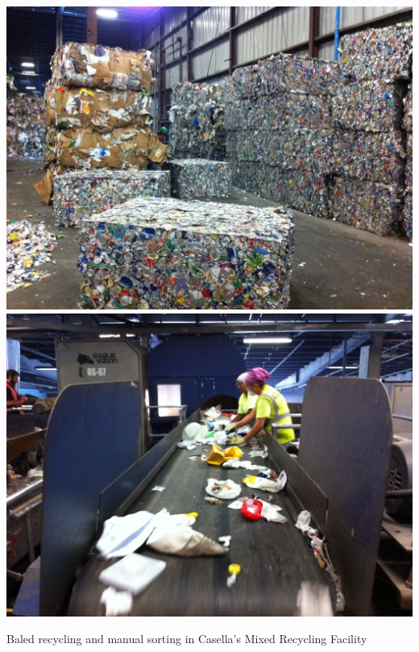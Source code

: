 \documentclass[nofonts,nols,justified,nobib]{tufte-book}
\begin{document}
\begin{marginfigure}
\includegraphics[width=\textwidth]{img/1/casella-bales.jpg}
\includegraphics[width=\textwidth]{img/1/casella-sorting.jpg}
\caption{Baled recycling and manual sorting in Casella's Mixed Recycling Facility \cite{delichatsios_trash_2011}}
\end{marginfigure}
\end{document}
